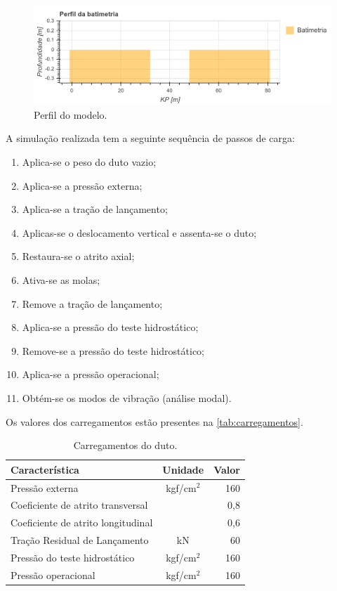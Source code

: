 \begin{figure}[!ht]
    \centering
    \caption{Perfil do modelo.}\label{fig:ex_perfil_da_batimetria}
    \includegraphics[width=\textwidth]{imagens/ex_perfil_da_batimetriat.png}
\end{figure}

A simulação realizada tem a seguinte sequência de passos de carga:

\begin{enumerate}
	\item Aplica-se o peso do duto vazio;
	\item Aplica-se a pressão externa;
	\item Aplica-se a tração de lançamento;
	\item Aplicas-se o deslocamento vertical e assenta-se o duto;
	\item Restaura-se o atrito axial;
	\item Ativa-se as molas;
	\item Remove a tração de lançamento;
	\item Aplica-se a pressão do teste hidrostático;
	\item Remove-se a pressão do teste hidrostático;
	\item Aplica-se a pressão operacional;
	\item Obtém-se os modos de vibração (análise modal).
\end{enumerate}

Os valores dos carregamentos estão presentes na \autoref{tab:carregamentos}.

\begin{table}[h]
	\renewcommand{\arraystretch}{1.2}
	\small
	\centering
	\caption{\label{tab:carregamentos} Carregamentos do duto.}
	\begin{tabular}{lcr}
		\toprule
		Característica & Unidade & Valor\\
		\midrule
		Pressão externa & kgf/cm$^2$ & 160\\
		Coeficiente de atrito transversal & & 0,8\\
		Coeficiente de atrito longitudinal & & 0,6\\
		Tração Residual de Lançamento & kN & 60\\
		Pressão do teste hidrostático & kgf/cm$^2$ & 160\\ %
		Pressão operacional & kgf/cm$^2$ & 160\\ %
		\bottomrule
	\end{tabular}
\end{table}

